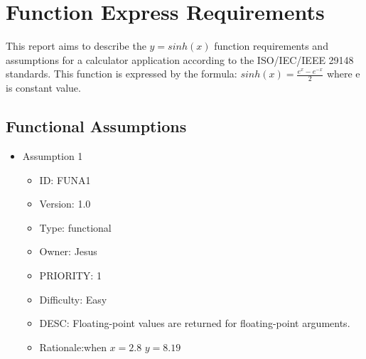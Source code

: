 \documentclass[12pt]{report}
\begin{document}
\section{Function Express Requirements}
 

This report aims to describe the $y=sinh(x)$ function requirements and assumptions for a calculator application according to the ISO/IEC/IEEE 29148 standards.
This function is expressed by the formula:
$sinh(x)= \frac{e^x- e^{-x}}{2}$ where e is constant value.

\subsection{Functional Assumptions}

\begin{itemize}
\item Assumption 1
\begin{itemize}
\item ID:       FUNA1
\item Version:  1.0
\item Type:     functional
\item Owner:    Jesus
\item PRIORITY: 1 
\item Difficulty: Easy
\item DESC: Floating-point values are returned for floating-point arguments.
\item Rationale:when $x=2.8$  $y = 8.19$


\end{itemize}
\end{itemize}
\end{document}
